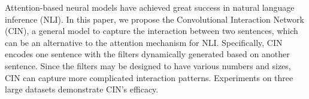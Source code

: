 Attention-based neural models have achieved great success in natural language inference (NLI). In this paper, we propose the Convolutional Interaction Network (CIN), a general model to capture the interaction between two sentences, which can be an alternative to the attention mechanism for NLI. Specifically, CIN encodes one sentence with the filters dynamically generated based on another sentence. Since the filters may be designed to have various numbers and sizes, CIN can capture more complicated interaction patterns. Experiments on three large datasets demonstrate CIN's efficacy.
